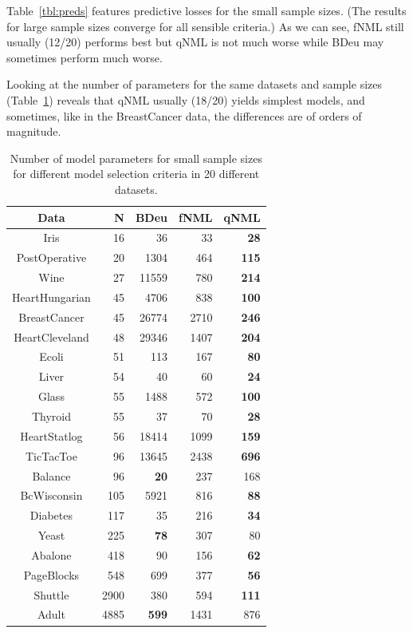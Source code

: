 \documentclass[letterpaper]{article}
\begin{document}
Table~\ref{tbl:preds} features predictive losses for the small sample
sizes.  (The results for large sample sizes converge for all sensible
criteria.)  As we can see, fNML still usually (12/20) performs best
but qNML is not much worse while BDeu may sometimes perform much
worse.

Looking at the number of parameters for the same datasets and sample
sizes (Table~\ref{tbl:nofparams}) reveals that qNML usually (18/20)
yields simplest models, and sometimes, like in the BreastCancer data,
the differences are of orders of magnitude.

\begin{table}
\centering
\begin{tabular}{crrrr}
\toprule
           Data &     N &          BDeu &  fNML &          qNML \\
\midrule
           Iris &    16 &            36 &    33 &   \textbf{28} \\
  PostOperative &    20 &          1304 &   464 &  \textbf{115} \\
           Wine &    27 &         11559 &   780 &  \textbf{214} \\
 HeartHungarian &    45 &          4706 &   838 &  \textbf{100} \\
   BreastCancer &    45 &         26774 &  2710 &  \textbf{246} \\
 HeartCleveland &    48 &         29346 &  1407 &  \textbf{204} \\
          Ecoli &    51 &           113 &   167 &   \textbf{80} \\
          Liver &    54 &            40 &    60 &   \textbf{24} \\
          Glass &    55 &          1488 &   572 &  \textbf{100} \\
        Thyroid &    55 &            37 &    70 &   \textbf{28} \\
   HeartStatlog &    56 &         18414 &  1099 &  \textbf{159} \\
      TicTacToe &    96 &         13645 &  2438 &  \textbf{696} \\
        Balance &    96 &   \textbf{20} &   237 &           168 \\
    BcWisconsin &   105 &          5921 &   816 &   \textbf{88} \\
       Diabetes &   117 &            35 &   216 &   \textbf{34} \\
          Yeast &   225 &   \textbf{78} &   307 &            80 \\
        Abalone &   418 &            90 &   156 &   \textbf{62} \\
     PageBlocks &   548 &           699 &   377 &   \textbf{56} \\
        Shuttle &  2900 &           380 &   594 &  \textbf{111} \\
          Adult &  4885 &  \textbf{599} &  1431 &           876 \\
\bottomrule
\end{tabular}
\caption{Number of model parameters for small sample sizes for different model selection criteria in 20 different datasets.}
\label{tbl:nofparams}
\end{table}
\end{document}
